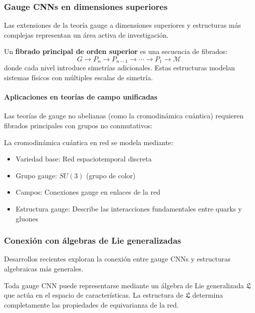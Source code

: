\subsubsection{Gauge CNNs en dimensiones superiores}

Las extensiones de la teoría gauge a dimensiones superiores y estructuras más complejas representan un área activa de investigación.

\begin{definition}
Un \textbf{fibrado principal de orden superior} es una secuencia de fibrados:
\begin{equation}
G \to P_n \to P_{n-1} \to \cdots \to P_1 \to \mathcal{M}
\end{equation}
donde cada nivel introduce simetrías adicionales. Estas estructuras modelan sistemas físicos con múltiples escalas de simetría.
\end{definition}

\paragraph{Aplicaciones en teorías de campo unificadas}
Las teorías de gauge no abelianas (como la cromodinámica cuántica) requieren fibrados principales con grupos no conmutativos:

\begin{example}
La cromodinámica cuántica en red se modela mediante:
\begin{itemize}
\item Variedad base: Red espaciotemporal discreta
\item Grupo gauge: $SU(3)$ (grupo de color)
\item Campos: Conexiones gauge en enlaces de la red
\item Estructura gauge: Describe las interacciones fundamentales entre quarks y gluones
\end{itemize}
\end{example}

\subsubsection{Conexión con álgebras de Lie generalizadas}

Desarrollos recientes exploran la conexión entre gauge CNNs y estructuras algebraicas más generales.

\begin{theorem}
Toda gauge CNN puede representarse mediante un álgebra de Lie generalizada $\mathfrak{L}$ que actúa en el espacio de características. La estructura de $\mathfrak{L}$ determina completamente las propiedades de equivarianza de la red.
\end{theorem}

